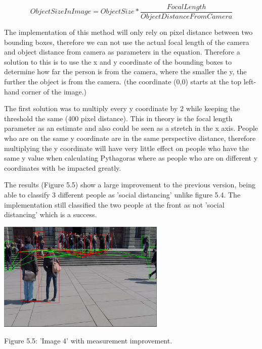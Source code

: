 \documentclass[12pt]{report}
\begin{document}
\begin{equation*}
Object Size In Image = Object Size * \frac{Focal Length}{Object Distance From Camera}
\end{equation*}

The implementation of this method will only rely on pixel distance between two bounding boxes, therefore we can not use the actual focal length of the camera and object distance from camera as parameters in the equation. Therefore a solution to this is to use the x and y coordinate of the bounding boxes to determine how far the person is from the camera, where the smaller the y, the further the object is from the camera. (the coordinate (0,0) starts at the top left-hand corner of the image.)

\vspace{2mm}

The first solution was to multiply every y coordinate by 2 while keeping the threshold the same (400 pixel distance). This in theory is the focal length parameter as an estimate and also could be seen as a stretch in the x axis. People who are on the same y coordinate are in the same perspective distance, therefore multiplying the y coordinate will have very little effect on people who have the same y value when calculating Pythagoras where as people who are on different y coordinates with be impacted greatly. 

\vspace{2mm}

The results (Figure 5.5) show a large improvement to the previous version, being able to classify 3 different people as 'social distancing' unlike figure 5.4. The implementation still classified the two people at the front as not 'social distancing' which is a success.

\begin{center}
	\includegraphics[width=80mm]{./images/appendix/PerspectiveSolution1.JPG}
	
	{\footnotesize Figure 5.5: 'Image 4' with measurement improvement.}
\end{center}
\end{document}
